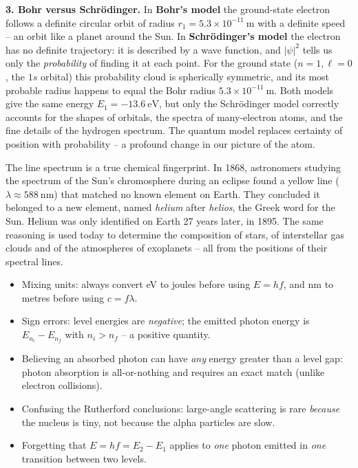 \documentclass[11pt]{article}
\begin{document}
\begin{exoresolu}
\textbf{3. Bohr versus Schr\"odinger.} In \textbf{Bohr's model} the ground-state electron follows a definite circular orbit of radius $r_1 = 5.3\times10^{-11}\ \mathrm{m}$ with a definite speed -- an orbit like a planet around the Sun. In \textbf{Schr\"odinger's model} the electron has no definite trajectory: it is described by a wave function, and $|\psi|^2$ tells us only the \emph{probability} of finding it at each point. For the ground state ($n = 1, \ell = 0$, the $1s$ orbital) this probability cloud is spherically symmetric, and its most probable radius happens to equal the Bohr radius $5.3\times10^{-11}\ \mathrm{m}$. Both models give the same energy $E_1 = -13.6\ \mathrm{eV}$, but only the Schr\"odinger model correctly accounts for the shapes of orbitals, the spectra of many-electron atoms, and the fine details of the hydrogen spectrum. The quantum model replaces certainty of position with probability -- a profound change in our picture of the atom.
\end{exoresolu}

\begin{savaistu}
The line spectrum is a true chemical fingerprint. In 1868, astronomers studying the spectrum of the Sun's chromosphere during an eclipse found a yellow line ($\lambda \approx 588\ \mathrm{nm}$) that matched no known element on Earth. They concluded it belonged to a new element, named \emph{helium} after \emph{helios}, the Greek word for the Sun. Helium was only identified on Earth 27 years later, in 1895. The same reasoning is used today to determine the composition of stars, of interstellar gas clouds and of the atmospheres of exoplanets -- all from the positions of their spectral lines.
\end{savaistu}

\begin{attention}
\begin{itemize}
\item Mixing units: always convert eV to joules before using $E = hf$, and nm to metres before using $c = f\lambda$.
\item Sign errors: level energies are \emph{negative}; the emitted photon energy is $E_{n_i} - E_{n_f}$ with $n_i > n_f$ -- a positive quantity.
\item Believing an absorbed photon can have \emph{any} energy greater than a level gap: photon absorption is all-or-nothing and requires an exact match (unlike electron collisions).
\item Confusing the Rutherford conclusions: large-angle scattering is rare \emph{because} the nucleus is tiny, not because the alpha particles are slow.
\item Forgetting that $E = hf = E_2 - E_1$ applies to \emph{one} photon emitted in \emph{one} transition between two levels.
\end{itemize}
\end{attention}
\end{document}
